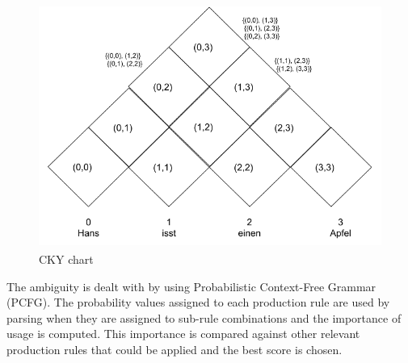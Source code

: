\documentclass[a4paper, 11pt]{article}
\begin{document}
\begin{figure}[H]
    \centering
    \includegraphics[width=\textwidth,height=8cm, keepaspectratio=true]
    {cky-parsing-chart-1.png}
    \caption{
        CKY chart
    }
    \label{fig:cky_parser_1}
\end{figure}

The ambiguity is dealt with by using Probabilistic Context-Free Grammar (PCFG). The probability values assigned to each production rule are used by parsing when they are assigned to sub-rule combinations and the importance of usage is computed. This importance is compared against other relevant production rules that could be applied and the best score is chosen.
\end{document}
